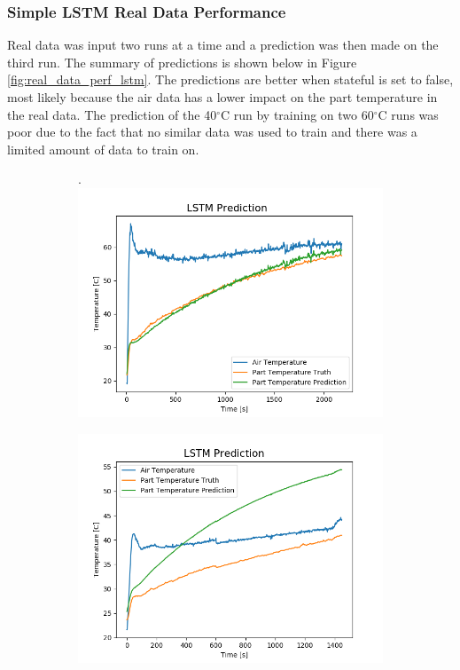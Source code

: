 \subsubsection{Simple LSTM Real Data Performance} \label{simple_perf}
Real data was input two runs at a time and a prediction was then made on the third run. The summary of predictions is shown below in Figure \ref{fig:real_data_perf_lstm}. The predictions are better when stateful is set to false, most likely because the air data has a lower impact on the part temperature in the real data. The prediction of the 40$^\circ$C run by training on two 60$^\circ$C runs was poor due to the fact that no similar data was used to train and there was a limited amount of data to train on. 
\begin{figure}[ht]
    \begin{subfigure}{.34\linewidth}.
        \centering
    	\includegraphics[width=\linewidth]{lstm/perf.png}
    \end{subfigure}
    \begin{subfigure}{.34\linewidth}
    	\centering
    	\includegraphics[width=\linewidth]{lstm/perf2.png}

\end{subfigure}
\end{figure}

